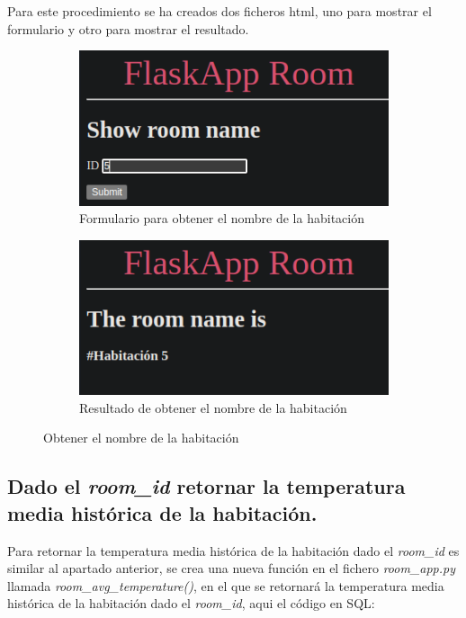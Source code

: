 \documentclass[11pt]{report}
\begin{document}
Para este procedimiento se ha creados dos ficheros html, uno para mostrar el formulario y otro para mostrar el resultado.
\begin{figure}[H]
  \begin{subfigure}{0.5\textwidth}
    \centering
    \includegraphics[scale=0.5]{img/room_name.png}
    \caption{Formulario para obtener el nombre de la habitación}
  \end{subfigure}%
  \begin{subfigure}{0.5\textwidth}
    \centering
    \includegraphics[scale=0.5]{img/result_room_name.png}
    \caption{Resultado de obtener el nombre de la habitación}
  \end{subfigure}
  \caption{Obtener el nombre de la habitación}
\end{figure}

\cleardoublepage

\subsection{Dado el \emph{room\_id} retornar la temperatura media histórica de la habitación.}
Para retornar la temperatura media histórica de la habitación dado el \emph{room\_id} es similar al apartado anterior,
se crea una nueva función en el fichero \emph{room\_app.py} llamada \emph{room\_avg\_temperature()}, en el que se retornará
la temperatura media histórica de la habitación dado el \emph{room\_id}, aqui el código en SQL:
\lstset{style=mystyle}

\end{document}
